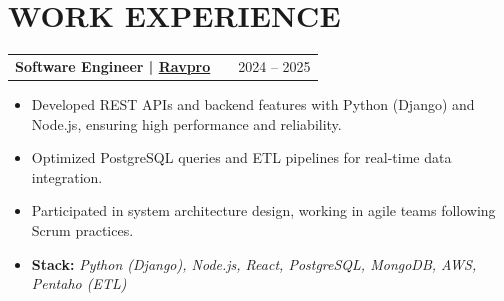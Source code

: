 \documentclass[a4paper,12pt]{article}
\makeatletter
\newenvironment{joblong}[2]
{
    \begin{tabularx}{\linewidth}{@{}l X r@{}}
        \textbf{#1} & \hfill & #2 \\[3.75pt]
    \end{tabularx}
    \begin{minipage}[t]{\linewidth}
    }
    {
    \end{minipage}
}
\newenvironment{bullets}
{
    \begin{itemize}[nosep,after=\strut, leftmargin=1em, itemsep=3pt,label=--]
    }
    {
    \end{itemize}
}
\makeatother
\begin{document}


    \section{WORK EXPERIENCE}


    \begin{joblong}{Software Engineer | \href{https://ravpro.com.br}{\textbf{Ravpro}}}{2024 -- 2025}
        \begin{bullets}
            \item Developed REST APIs and backend features with Python (Django) and Node.js, ensuring high performance and reliability.
            \item Optimized PostgreSQL queries and ETL pipelines for real-time data integration.
            \item Participated in system architecture design, working in agile teams following Scrum practices.
            \item \textbf{Stack:} \textit{Python (Django), Node.js, React, PostgreSQL, MongoDB, AWS, Pentaho (ETL)}
        \end{bullets}
    \end{joblong}
\end{document}

